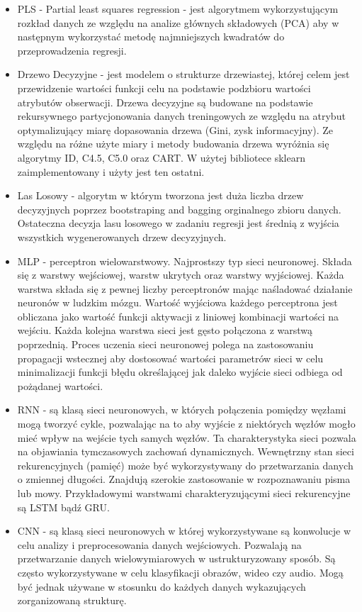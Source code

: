 \begin{itemize}
    \item PLS - Partial least squares regression - jest algorytmem wykorzystującym rozkład
    danych ze względu na analize głównych składowych (PCA) aby w następnym wykorzystać metodę
    najmniejszych kwadratów do przeprowadzenia regresji.

    \item Drzewo Decyzyjne - jest modelem o strukturze drzewiastej, której celem jest
    przewidzenie wartości funkcji celu na podstawie podzbioru wartości atrybutów obserwacji. 
    Drzewa decyzyjne są budowane na podstawie rekursywnego partycjonowania danych treningowych
    ze względu na atrybut optymalizujący miarę dopasowania drzewa (Gini, zysk informacyjny).
    Ze względu na różne użyte miary i metody budowania drzewa wyróżnia się algorytmy ID, C4.5,
    C5.0 oraz CART. W użytej bibliotece sklearn zaimplementowany i użyty jest ten ostatni.

    \item Las Losowy - algorytm w którym tworzona jest duża liczba drzew decyzyjnych poprzez
    bootstraping and bagging orginalnego zbioru danych. Ostateczna decyzja lasu losowego w 
    zadaniu regresji jest średnią z wyjścia wszystkich wygenerowanych drzew decyzyjnych.

    \item MLP - perceptron wielowarstwowy. Najprostszy typ sieci neuronowej. Składa się z 
    warstwy wejściowej, warstw ukrytych oraz warstwy wyjściowej. Każda warstwa składa się
    z pewnej liczby perceptronów mając naśladować działanie neuronów w ludzkim mózgu.
    Wartość wyjściowa każdego perceptrona jest obliczana jako wartość funkcji aktywacji z 
    liniowej kombinacji wartości na wejściu. Każda kolejna warstwa sieci jest gęsto połączona
    z warstwą poprzednią.
    Proces uczenia sieci neuronowej polega na zastosowaniu propagacji wstecznej aby dostosować
    wartości parametrów sieci w celu minimalizacji funkcji błędu określającej jak daleko
    wyjście sieci odbiega od pożądanej wartości. 

    \item RNN - są klasą sieci neuronowych, w których połączenia pomiędzy węzłami
    mogą tworzyć cykle, pozwalając na to aby wyjście z niektórych węzłów mogło mieć wpływ na 
    wejście tych samych węzłów. Ta charakterystyka sieci pozwala na objawiania tymczasowych 
    zachowań dynamicznych. Wewnętrzny stan sieci rekurencyjnych (pamięć) może być wykorzystywany
    do przetwarzania danych o zmiennej długości. Znajdują szerokie zastosowanie w rozpoznawaniu
    pisma lub mowy. Przykładowymi warstwami charakteryzującymi sieci rekurencyjne są LSTM bądź GRU.

    \item CNN - są klasą sieci neuronowych w której wykorzystywane są konwolucje w celu 
    analizy i preprocesowania danych wejściowych. Pozwalają na przetwarzanie danych wielowymiarowych
    w ustrukturyzowany sposób. Są często wykorzystywane w celu klasyfikacji obrazów, wideo czy
    audio. Mogą być jednak używane w stosunku do każdych danych wykazujących zorganizowaną strukturę.

\end{itemize}

